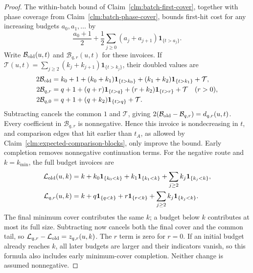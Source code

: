 \begin{proof}
The within-batch bound of Claim~\ref{clm:batch-first-cover},
together with phase coverage from Claim~\ref{clm:batch-phase-cover}, bounds
first-hit cost for any increasing budgets $a_0,a_1,\ldots$ by
\[
 \frac{a_0+1}{2}
 +\frac12\sum_{j\ge0}(a_j+a_{j+1})\mathbf1_{\{t>a_j\}}.
\]
Write $\mathcal B_{\rm old}(u,t)$ and
$\mathcal B_{q,r}(u,t)$ for these invoices. If
$\mathcal T(u,t)=\sum_{j\ge2}(k_j+k_{j+1})\mathbf1_{\{t>k_j\}}$,
their doubled values are
\[
 \begin{aligned}
 2\mathcal B_{\rm old}
 &=k_0+1+(k_0+k_1)\mathbf1_{\{t>k_0\}}
       +(k_1+k_2)\mathbf1_{\{t>k_1\}}+\mathcal T,\\
 2\mathcal B_{q,r}
 &=q+1+(q+r)\mathbf1_{\{t>q\}}
       +(r+k_2)\mathbf1_{\{t>r\}}+\mathcal T\quad(r>0),\\
 2\mathcal B_{q,0}
 &=q+1+(q+k_2)\mathbf1_{\{t>q\}}+\mathcal T.
 \end{aligned}
\]
Subtracting cancels the common $1$ and $\mathcal T$, giving
$2(\mathcal B_{\rm old}-\mathcal B_{q,r})=d_{q,r}(u,t)$.
Every coefficient in $\mathcal B_{q,r}$ is nonnegative. Hence
this invoice is nondecreasing in $t$, and comparison edges that
hit earlier than $t_A$, as allowed by
Claim~\ref{clm:expected-comparison-blocks}, only improve the bound.
Early completion removes nonnegative continuation terms. For the
negative route and $k=k_{\min}$, the full budget invoices are
\[
 \begin{aligned}
 \mathcal L_{\rm old}(u,k)
 &=k+k_0\mathbf1_{\{k_0<k\}}+k_1\mathbf1_{\{k_1<k\}}
        +\sum_{j\ge2}k_j\mathbf1_{\{k_j<k\}},\\
 \mathcal L_{q,r}(u,k)
 &=k+q\mathbf1_{\{q<k\}}+r\mathbf1_{\{r<k\}}
        +\sum_{j\ge2}k_j\mathbf1_{\{k_j<k\}}.
 \end{aligned}
\]
The final minimum cover contributes the same $k$; a budget below
$k$ contributes at most its full size. Subtracting now cancels both
the final cover and the common tail, so
$\mathcal L_{q,r}-\mathcal L_{\rm old}=z_{q,r}(u,k)$.
The $r$ term is zero for $r=0$. If an initial budget already reaches
$k$, all later budgets are larger and their indicators vanish,
so this formula also includes early minimum-cover completion.
Neither change is assumed nonnegative.
\end{proof}

